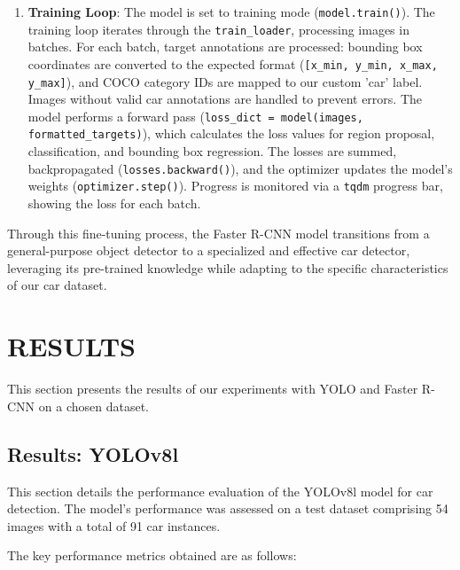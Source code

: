 \documentclass[conference]{IEEEtran}
\begin{document}
\begin{enumerate}
    \item \textbf{Training Loop}:
    The model is set to training mode (\texttt{model.train()}). The training loop iterates through the \texttt{train\_loader}, processing images in batches. For each batch, target annotations are processed: bounding box coordinates are converted to the expected format (\texttt{[x\_min, y\_min, x\_max, y\_max]}), and COCO category IDs are mapped to our custom 'car' label. Images without valid car annotations are handled to prevent errors. The model performs a forward pass (\texttt{loss\_dict = model(images, formatted\_targets)}), which calculates the loss values for region proposal, classification, and bounding box regression. The losses are summed, backpropagated (\texttt{losses.backward()}), and the optimizer updates the model's weights (\texttt{optimizer.step()}). Progress is monitored via a \texttt{tqdm} progress bar, showing the loss for each batch.
\end{enumerate}

Through this fine-tuning process, the Faster R-CNN model transitions from a general-purpose object detector to a specialized and effective car detector, leveraging its pre-trained knowledge while adapting to the specific characteristics of our car dataset.

\section{\uppercase{Results}} 
\label{sec:results}
This section presents the results of our experiments with YOLO and Faster R-CNN on a chosen dataset. 

\subsection{Results: YOLOv8l}
\label{ssec:results_yolo}

This section details the performance evaluation of the YOLOv8l model for car detection. The model's performance was assessed on a test dataset comprising 54 images with a total of 91 car instances.

The key performance metrics obtained are as follows:
\end{document}
